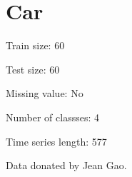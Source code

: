 \chapter{Car}
\hypertarget{md_external_2data_2UCRArchive__2018_2Car_2README}{}\label{md_external_2data_2UCRArchive__2018_2Car_2README}
\label{md_external_2data_2UCRArchive__2018_2Car_2README_autotoc_md25}%
%
 Train size\+: 60

Test size\+: 60

Missing value\+: No

Number of classses\+: 4

Time series length\+: 577

Data donated by Jean Gao. 